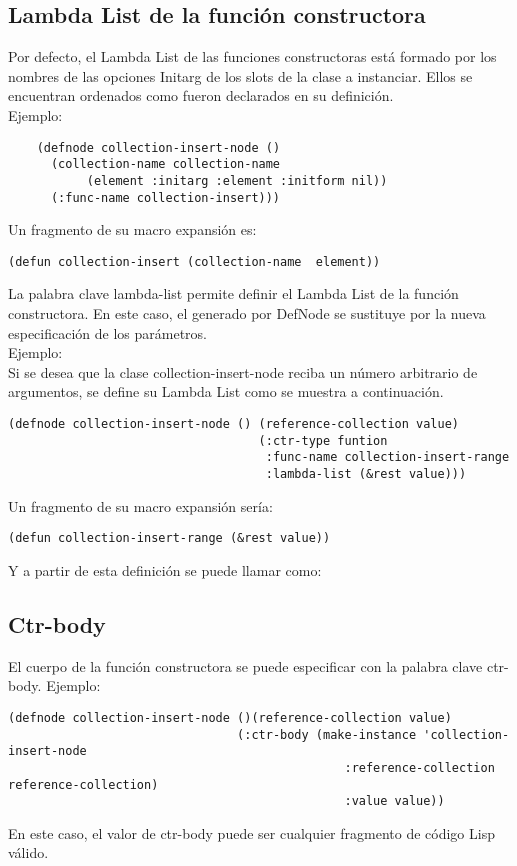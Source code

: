 \subsection{Lambda List de la función constructora}
Por defecto, el Lambda List de las funciones constructoras está formado por los nombres de las opciones Initarg de los slots de la clase a instanciar. Ellos se encuentran ordenados como fueron declarados en su definición.\\ 
Ejemplo:
\begin{verbatim}
	(defnode collection-insert-node () 
	  (collection-name collection-name 
	       (element :initarg :element :initform nil))
	  (:func-name collection-insert)))
\end{verbatim}
Un fragmento de su macro expansión es:
\begin{verbatim}
(defun collection-insert (collection-name  element))
\end{verbatim}
La palabra clave lambda-list permite definir el Lambda List de la función constructora. En este caso, el generado por DefNode se sustituye por la nueva especificación de los parámetros.\\ 
Ejemplo:\\
Si se desea que la clase collection-insert-node reciba un número arbitrario de argumentos, se define su Lambda List como se muestra a continuación.
\begin{verbatim}
(defnode collection-insert-node () (reference-collection value) 
                                   (:ctr-type funtion 
                                    :func-name collection-insert-range 
                                    :lambda-list (&rest value)))
\end{verbatim}
Un fragmento de su macro expansión sería:
\begin{verbatim}
(defun collection-insert-range (&rest value))
\end{verbatim}

Y a partir de esta definición se puede llamar como: 

\subsection{Ctr-body}

El cuerpo de la función constructora se puede especificar con la palabra clave ctr-body.
Ejemplo:
\begin{verbatim}
(defnode collection-insert-node ()(reference-collection value)
								(:ctr-body (make-instance 'collection-insert-node
								               :reference-collection reference-collection)
								               :value value))
\end{verbatim}
En este caso, el valor de ctr-body puede ser cualquier fragmento de código Lisp válido.



